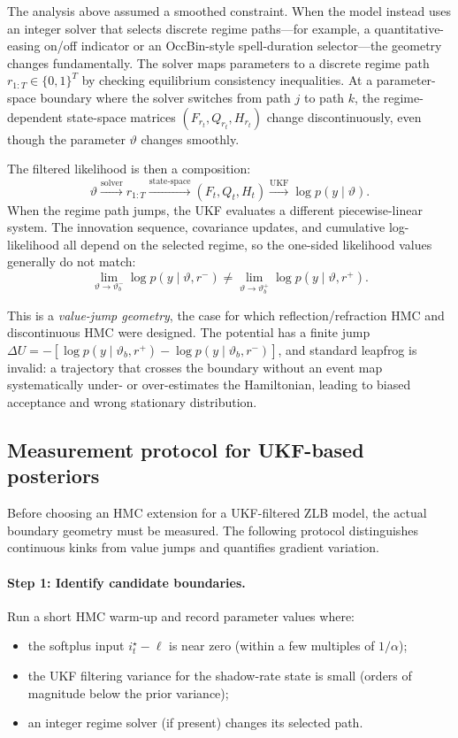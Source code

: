 \documentclass[11pt]{article}
\begin{document}
The analysis above assumed a smoothed constraint. When the model instead uses
an integer solver that selects discrete regime paths—for example, a
quantitative-easing on/off indicator or an OccBin-style spell-duration
selector—the geometry changes fundamentally. The solver maps parameters to a
discrete regime path $r_{1:T}\in\{0,1\}^T$ by checking equilibrium consistency
inequalities. At a parameter-space boundary where the solver switches from path
$j$ to path $k$, the regime-dependent state-space matrices $(F_{r_t},
Q_{r_t}, H_{r_t})$ change discontinuously, even though the parameter
$\vartheta$ changes smoothly.

The filtered likelihood is then a composition:
\[
 \vartheta \xrightarrow{\text{solver}} r_{1:T}
          \xrightarrow{\text{state-space}} (F_t, Q_t, H_t)
          \xrightarrow{\text{UKF}} \log p(y\mid\vartheta).
\]
When the regime path jumps, the UKF evaluates a different piecewise-linear
system. The innovation sequence, covariance updates, and cumulative
log-likelihood all depend on the selected regime, so the one-sided likelihood
values generally do not match:
\[
 \lim_{\vartheta\to\vartheta_b^-}\log p(y\mid\vartheta, r^-)
 \ne \lim_{\vartheta\to\vartheta_b^+}\log p(y\mid\vartheta, r^+).
\]

This is a \emph{value-jump geometry}, the case for which reflection/refraction
HMC and discontinuous HMC were designed. The potential has a finite jump
$\Delta U = -[\log p(y\mid\vartheta_b,r^+) - \log p(y\mid\vartheta_b,r^-)]$,
and standard leapfrog is invalid: a trajectory that crosses the boundary
without an event map systematically under- or over-estimates the Hamiltonian,
leading to biased acceptance and wrong stationary distribution.

\subsection{Measurement protocol for UKF-based posteriors}\label{sec:ukf-measurement}

Before choosing an HMC extension for a UKF-filtered ZLB model, the actual
boundary geometry must be measured. The following protocol distinguishes
continuous kinks from value jumps and quantifies gradient variation.

\paragraph{Step 1: Identify candidate boundaries.}
Run a short HMC warm-up and record parameter values where:
\begin{itemize}
\item the softplus input $i_t^\star - \ell$ is near zero (within a few
      multiples of $1/\alpha$);
\item the UKF filtering variance for the shadow-rate state is small (orders of
      magnitude below the prior variance);
\item an integer regime solver (if present) changes its selected path.
\end{itemize}
\end{document}
